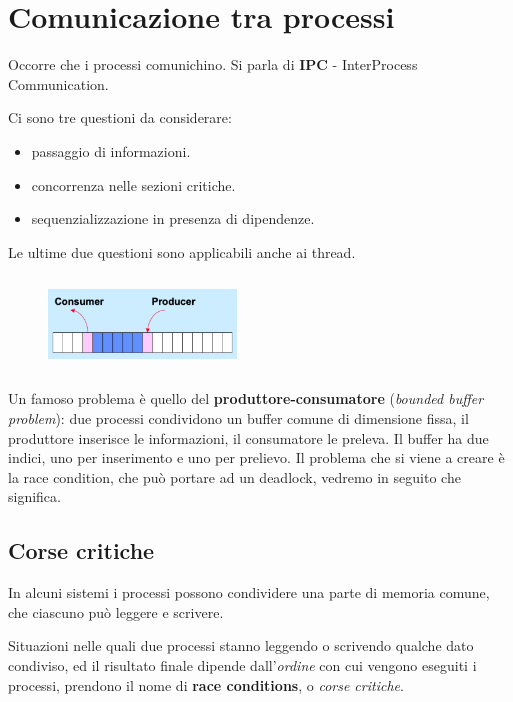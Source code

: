 \chapter{Comunicazione tra processi}
\thispagestyle{empty}

Occorre che i processi comunichino. Si parla di \textbf{IPC} - InterProcess Communication.

Ci sono tre questioni da considerare:
\begin{itemize}
    \item passaggio di informazioni.
    \item concorrenza nelle sezioni critiche.
    \item sequenzializzazione in presenza di dipendenze.
\end{itemize}

Le ultime due questioni sono applicabili anche ai thread.

\begin{figure}
    \vspace{-5mm}
    \includegraphics[width=50mm,height=25mm,keepaspectratio]{assets/producerconsumer6.png}
\end{figure}

Un famoso problema è quello del \textbf{produttore-consumatore} (\textit{bounded buffer problem}): due processi condividono un buffer comune di dimensione fissa, il produttore inserisce le informazioni, il consumatore le preleva. Il buffer ha due indici, uno per inserimento e uno per prelievo. Il problema che si viene a creare è la race condition, che può portare ad un deadlock, vedremo in seguito che significa.




\section{Corse critiche}
In alcuni sistemi i processi possono condividere una parte di memoria comune, che ciascuno può leggere e scrivere.

Situazioni nelle quali due processi stanno leggendo o scrivendo qualche dato condiviso, ed il risultato finale dipende dall'\textit{ordine} con cui vengono eseguiti i processi, prendono il nome di \textbf{race conditions}, o \textit{corse critiche}.


